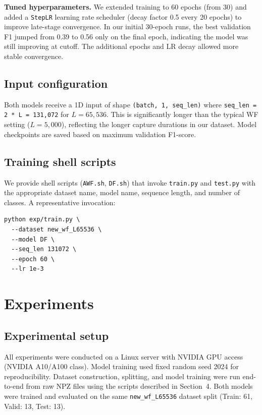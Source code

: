 \documentclass[letterpaper,twocolumn,10pt]{article}
\begin{document}
\textbf{Tuned hyperparameters.} We extended training to 60 epochs (from 30) and added a \texttt{StepLR} learning rate scheduler (decay factor 0.5 every 20 epochs) to improve late-stage convergence. In our initial 30-epoch runs, the best validation F1 jumped from 0.39 to 0.56 only on the final epoch, indicating the model was still improving at cutoff. The additional epochs and LR decay allowed more stable convergence.

\subsection{Input configuration}
Both models receive a 1D input of shape \texttt{(batch, 1, seq\_len)} where \texttt{seq\_len = 2 * L = 131,072} for $L = 65{,}536$. This is significantly longer than the typical WF setting ($L = 5{,}000$), reflecting the longer capture durations in our dataset. Model checkpoints are saved based on maximum validation F1-score.

\subsection{Training shell scripts}
We provide shell scripts (\texttt{AWF.sh}, \texttt{DF.sh}) that invoke \texttt{train.py} and \texttt{test.py} with the appropriate dataset name, model name, sequence length, and number of classes. A representative invocation:
\begin{verbatim}
python exp/train.py \
  --dataset new_wf_L65536 \
  --model DF \
  --seq_len 131072 \
  --epoch 60 \
  --lr 1e-3
\end{verbatim}

\section{Experiments}

\subsection{Experimental setup}
All experiments were conducted on a Linux server with NVIDIA GPU access (NVIDIA A10/A100 class). Model training used fixed random seed 2024 for reproducibility. Dataset construction, splitting, and model training were run end-to-end from raw NPZ files using the scripts described in Section~4. Both models were trained and evaluated on the same \texttt{new\_wf\_L65536} dataset split (Train: 61, Valid: 13, Test: 13).
\end{document}
